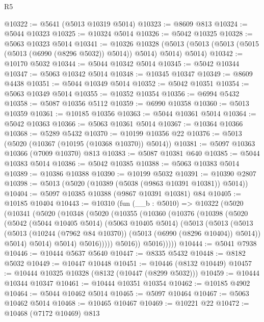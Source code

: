 \begin{lexlean}{R5}
\begin{coremodule}
@10322 := @5641 (@5013 @10319 @5014)
@10323 := @8609 @813
@10324 := @5044 @10323
@10325 := @10324 @5014
@10326 := @5042 @10325
@10328 := @5063 @10323 @5014
@10341 := @10326
    @10328
    (@5013 (@5013 (@5013 (@5015 (@5013 (@6990 (@8296 @5032)) @5014)) @5014) @5014) @5014)
@10342 := @10170 @5032
@10344 := @5044 @10342 @5014
@10345 := @5042 @10344
@10347 := @5063 @10342 @5014
@10348 := @10345 @10347
@10349 := @8609 @4438
@10351 := @5044 @10349 @5014
@10352 := @5042 @10351
@10354 := @5063 @10349 @5014
@10355 := @10352 @10354
@10356 := @6994 @5432
@10358 := @5087 @10356 @5112
@10359 := @6990 @10358
@10360 := @5013 @10359
@10361 := @10185 @10356
@10363 := @5044 @10361 @5014
@10364 := @5042 @10363
@10366 := @5063 @10361 @5014
@10367 := @10364 @10366
@10368 := @5289 @5432
@10370 := @10199 @10356 @22
@10376 := @5013 (@5020 (@10367 (@10195 (@10368 @10370)) @5014))
@10381 := @5097 @10363 @10366 (@7009 @10370) @813
@10383 := @5087 @10381 @640
@10385 := @5044 @10383 @5014
@10386 := @5042 @10385
@10388 := @5063 @10383 @5014
@10389 := @10386 @10388
@10390 := @10199 @5032
@10391 := @10390 @2807
@10398 := @5013 (@5020 (@10389 (@5038 (@9863 @10391 @10381)) @5014))
@10404 := @5097 @10385 @10388 (@9867 @10391 @10381) @84
@10405 := @10185 @10404
@10443 := @10310
    (fun (__b : @5010) =>
    @10322
      (@5020
        (@10341
          (@5020
            (@10348
              (@5020
                (@10355
                  (@10360
                    (@10376
                      (@10398
                        (@5020
                          (@5042
                            (@5044 @10405 @5014)
                            (@5063 @10405 @5014)
                            (@5013
                              (@5013
                                (@5013
                                  (@5013
                                    (@10244 (@7962 @84 @10370))
                                    (@5013 (@6990 (@8296 @10404)) @5014))
                                  @5014)
                                @5014)
                              @5014)
                            @5016)))))
                  @5016))
              @5016)))))
@10444 := @5041 @7938
@10446 := @10444 @5637 @5640
@10447 := @8335 @5432
@10448 := @8182 @5032
@10449 := @10447 @10448
@10451 := @10446 (@8132 @10449)
@10457 := @10444 @10325 @10328 (@8132 (@10447 (@8299 @5032)))
@10459 := @10444 @10344 @10347
@10461 := @10444 @10351 @10354
@10462 := @10185 @4902
@10464 := @5044 @10462 @5014
@10465 := @5097 @10464
@10467 := @5063 @10462 @5014
@10468 := @10465 @10467
@10469 := @10221 @22
@10472 := @10468 (@7172 @10469) @813

\end{coremodule}
\end{lexlean}
